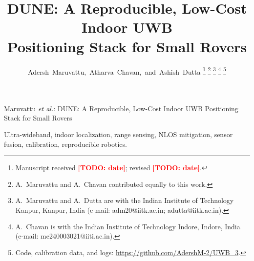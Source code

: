 \documentclass[10pt,journal,letterpaper]{IEEEtran}
\newcommand{\todo}[1]{\textcolor{red}{\textbf{[TODO: #1]}}}
\begin{document}
\title{DUNE: A Reproducible, Low-Cost Indoor UWB\\
  Positioning Stack for Small Rovers}

\author{Adersh~Maruvattu,~Atharva~Chavan,~and~Ashish~Dutta%
\thanks{Manuscript received \todo{date}; revised \todo{date}.}%
\thanks{A.~Maruvattu and A.~Chavan contributed equally to this work.}%
\thanks{A.~Maruvattu and A.~Dutta are with the Indian Institute of
  Technology Kanpur, Kanpur, India (e-mail: adm20@iitk.ac.in;
  adutta@iitk.ac.in).}%
\thanks{A.~Chavan is with the Indian Institute of Technology Indore,
  Indore, India (e-mail: me240003021@iiti.ac.in).}%
\thanks{Code, calibration data, and logs:
  \url{https://github.com/AdershM-2/UWB_3}.}}

%
{Maruvattu \MakeLowercase{\textit{et al.}}: DUNE: A Reproducible, Low-Cost Indoor UWB Positioning Stack for Small Rovers}

\maketitle

\begin{abstract}

\end{abstract}

\begin{IEEEkeywords}
Ultra-wideband, indoor localization, range sensing, NLOS mitigation,
sensor fusion, calibration, reproducible robotics.
\end{IEEEkeywords}

\IEEEpeerreviewmaketitle











\end{document}
